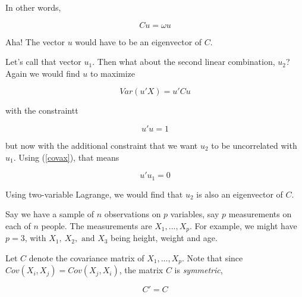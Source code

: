 In other words,

\begin{equation}
Cu = \omega u
\end{equation}

Aha!  The vector $u$ would have to be an eigenvector of $C$.  

Let's call that vector $u_1$.  Then what about the second linear
combination, $u_2$?  Again we would find $u$ to maximize

\begin{equation}
Var(u'X) = u' C u
\end{equation}

with the constraintt

\begin{equation}
u'u = 1
\end{equation}

but now with the additional constraint that we want $u_2$ to be
uncorrelated with $u_1$.  Using (\ref{covax}), that means

\begin{equation}
u'u_1 = 0
\end{equation}

Using two-variable Lagrange, we would find that $u_2$ is also an
eigenvector of $C$.

Say we have a sample of $n$ observations on $p$ variables, say $p$
measurements on each of $n$ people.  The measurements are $X_1,...,X_p$.
For example, we might have $p=3$, with $X_1, ~ X_2, \textrm{ and } X_3$
being height, weight and age.  

% 
% 
% 

Let $C$ denote the covariance matrix of $X_1,...,X_p$.  Note that
since $Cov(X_i,X_j) = Cov(X_j,X_i)$, 
the matrix $C$ is \emph{symmetric},

\begin{equation}
C' = C
\end{equation}

